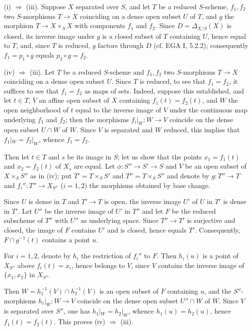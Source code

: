 (i) $\Rightarrow$ (iii). Suppose $X$ separated over $S$, and let $T$ be a reduced $S$-scheme, $f_1,f_2$ two $S$-morphisms $T\to X$ coinciding on a dense open subset $U$ of $T$, and $g$ the morphism $T\to X\times_SX$ with components $f_1$ and $f_2$. Since $D=\Delta_{X/S}(X)$ is closed, its inverse image under $g$ is a closed subset of $T$ containing $U$, hence equal to $T$, and, since $T$ is reduced, $g$ factors through $D$ (cf. EGA I, 5.2.2); consequently $f_1=p_1\circ g$ equals $p_2\circ g=f_2$.

(iv) $\Rightarrow$ (iii). Let $T$ be a reduced $S$-scheme and $f_1,f_2$ two $S$-morphisms $T\to X$ coinciding on a dense open subset $U$. Since $T$ is reduced, to see that $f_1=f_2$, it suffices to see that $f_1=f_2$ as maps of sets. Indeed, suppose this established, and let $t\in T$, $V$ an affine open subset of $X$ containing $f_1(t)=f_2(t)$, and $W$ the open neighborhood of $t$ equal to the inverse image of $V$ under the continuous map underlying $f_1$ and $f_2$; then the morphisms $f_i|_W:W\to V$ coincide on the dense open subset $U\cap W$ of $W$. Since $V$ is separated and $W$ reduced, this implies that $f_1|_W=f_2|_W$, whence $f_1=f_2$.

Then let $t\in T$ and $s$ be its image in $S$; let us show that the points $x_1=f_1(t)$ and $x_2=f_2(t)$ of $X_s$ are equal. Let $\phi:S''\to S'\to S$ and $V$ be an open subset of $X\times_SS''$ as in (iv); put $T'=T\times_SS'$ and $T''=T\times_SS''$ and denote by $g:T''\to T$ and $f_i'':T''\to X_{S''}$ ($i=1,2$) the morphisms obtained by base change.

Since $U$ is dense in $T$ and $T'\to T$ is open, the inverse image $U'$ of $U$ in $T'$ is dense in $T'$. Let $U''$ be the inverse image of $U'$ in $T''$ and let $F$ be the reduced subscheme of $T''$ with $\overline{U''}$ as underlying space. Since $T''\to T'$ is surjective and closed, the image of $F$ contains $U'$ and is closed, hence equals $T'$. Consequently, $F\cap g^{-1}(t)$ contains a point $u$.

For $i=1,2$, denote by $h_i$ the restriction of $f_i''$ to $F$. Then $h_i(u)$ is a point of $X_{S''}$ above $f_i(t)=x_i$, hence belongs to $V$, since $V$ contains the inverse image of $\{x_1,x_2\}$ in $X_{S''}$.

Then $W=h_1^{-1}(V)\cap h_2^{-1}(V)$ is an open subset of $F$ containing $u$, and the $S''$-morphisms $h_i|_W:W\to V$ coincide on the dense open subset $U''\cap W$ of $W$. Since $V$ is separated over $S''$, one has $h_1|_W=h_2|_W$, whence $h_1(u)=h_2(u)$, hence $f_1(t)=f_2(t)$. This proves (iv) $\Rightarrow$ (iii).

